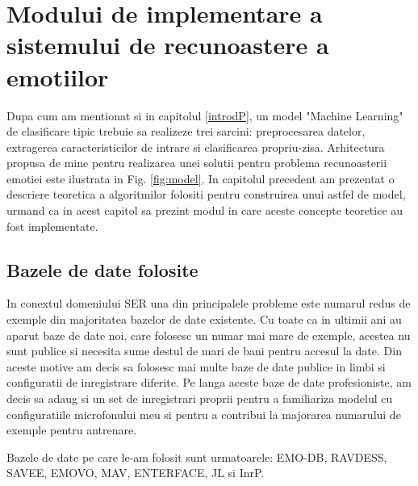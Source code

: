 \documentclass[a4paper,12pt]{book}
\begin{document}
				\section{Modului de implementare a sistemului de recunoastere a emotiilor}
				
				Dupa cum am mentionat si in capitolul \ref{introdP}, un model "Machine Learning" de clasificare tipic trebuie sa realizeze trei sarcini: preprocesarea datelor, extragerea caracteristicilor de intrare si clasificarea propriu-zisa. Arhitectura propusa de mine pentru realizarea unei solutii pentru problema recunoasterii emotiei este ilustrata in Fig. \ref{fig:model}. In capitolul precedent am prezentat o descriere teoretica a algoritmilor folositi pentru construirea unui astfel de model, urmand ca in acest capitol sa prezint modul in care aceste concepte teoretice au fost implementate.
				
					\subsection {Bazele de date folosite} \label{datasets}
					In conextul domeniului SER una din principalele probleme este numarul redus de exemple din majoritatea bazelor de date existente. Cu toate ca in ultimii ani au aparut baze de date noi, care folosesc un numar mai mare de exemple, acestea nu sunt publice si necesita sume destul de mari de bani pentru accesul la date. Din aceste motive am decis sa folosesc mai multe baze de date publice in limbi si configuratii de inregistrare diferite. Pe langa aceste baze de date profesioniste, am decis sa adaug si un set de inregistrari proprii pentru a familiariza modelul cu configuratiile microfonului meu si pentru a contribui la majorarea numarului de exemple pentru antrenare.\par
					
					\newpage
					Bazele de date pe care le-am folosit sunt urmatoarele: EMO-DB, RAVDESS, SAVEE, EMOVO, MAV, ENTERFACE, JL si InrP.
					
\end{document}
